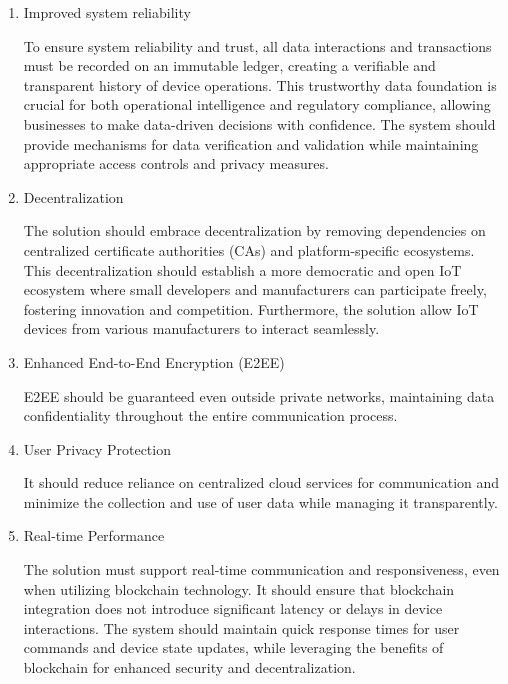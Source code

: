 \documentclass[conference]{IEEEtran}
\begin{document}
\begin{enumerate}[itemsep=2ex, parsep=1ex]
	\item Improved system reliability
	      	      	      
	      To ensure system reliability and trust, all data interactions and transactions
	      must be recorded on an immutable ledger, creating a verifiable and
	      transparent history of device operations. This trustworthy data foundation
	      is crucial for both operational intelligence and regulatory compliance,
	      allowing businesses to make data-driven decisions with confidence. The system
	      should provide mechanisms for data verification and validation while maintaining
	      appropriate access controls and privacy measures.
	      	      	      
	\item Decentralization
	      	      	      
	      The solution should embrace decentralization by removing dependencies on
	      centralized certificate authorities (CAs) and platform-specific ecosystems.
	      This decentralization should establish a more democratic and open IoT ecosystem
	      where small developers and manufacturers can participate freely, fostering
	      innovation and competition. Furthermore, the solution allow IoT devices
	      from various manufacturers to interact seamlessly.
	      	      	      
	\item Enhanced End-to-End Encryption (E2EE)
	      	      	      
	      E2EE should be guaranteed even outside private networks, maintaining data confidentiality
	      throughout the entire communication process.
	      	      	      
	\item User Privacy Protection
	      	      	      
	      It should reduce reliance on centralized cloud services for communication
	      and minimize the collection and use of user data while managing it
	      transparently.
	      	      	      
	\item Real-time Performance
	      	      	      
	      The solution must support real-time communication and responsiveness, even
	      when utilizing blockchain technology. It should ensure that blockchain
	      integration does not introduce significant latency or delays in device
	      interactions. The system should maintain quick response times for user commands
	      and device state updates, while leveraging the benefits of blockchain for
	      enhanced security and decentralization.
	      	      	                  
\end{enumerate}
            
\end{document}
